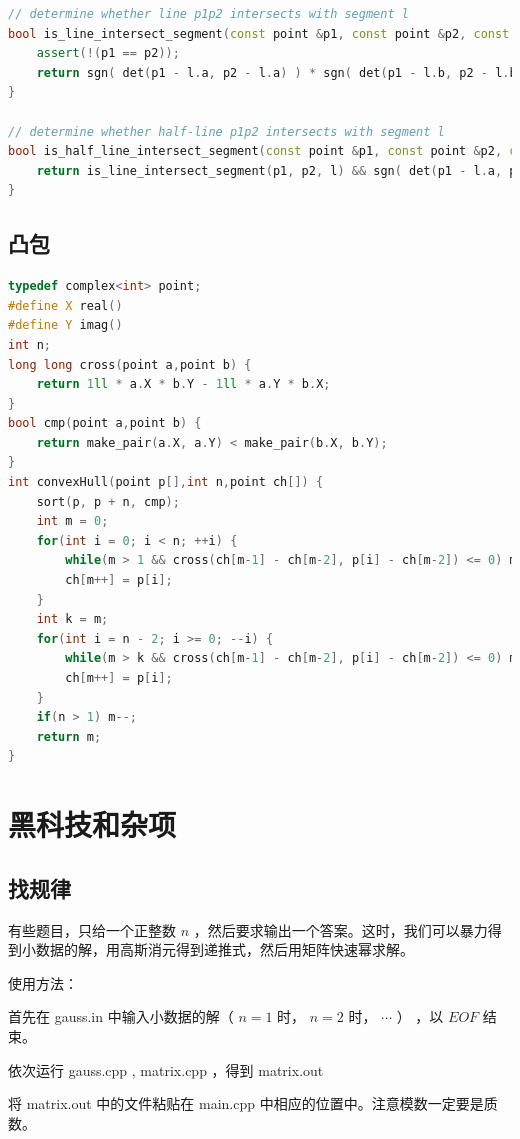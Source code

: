 \documentclass{article}
\begin{document}
\begin{lstlisting}[language=C++]
// determine whether line p1p2 intersects with segment l
bool is_line_intersect_segment(const point &p1, const point &p2, const segment &l) {
	assert(!(p1 == p2));
	return sgn( det(p1 - l.a, p2 - l.a) ) * sgn( det(p1 - l.b, p2 - l.b) ) <= 0;
}

// determine whether half-line p1p2 intersects with segment l
bool is_half_line_intersect_segment(const point &p1, const point &p2, const segment &l) {
	return is_line_intersect_segment(p1, p2, l) && sgn( det(p1 - l.a, p2 - l.a) ) * sgn( det(p1 - l.a, l.b - l.a) ) >= 0;
}

\end{lstlisting}

\subsection{凸包}
\begin{lstlisting}[language=C++]
typedef complex<int> point;
#define X real()
#define Y imag()
int n;
long long cross(point a,point b) {
	return 1ll * a.X * b.Y - 1ll * a.Y * b.X;
}
bool cmp(point a,point b) {
	return make_pair(a.X, a.Y) < make_pair(b.X, b.Y);
}
int convexHull(point p[],int n,point ch[]) {
	sort(p, p + n, cmp);
	int m = 0;
	for(int i = 0; i < n; ++i) {
		while(m > 1 && cross(ch[m-1] - ch[m-2], p[i] - ch[m-2]) <= 0) m--;
		ch[m++] = p[i];
	}
	int k = m;
	for(int i = n - 2; i >= 0; --i) {
		while(m > k && cross(ch[m-1] - ch[m-2], p[i] - ch[m-2]) <= 0) m--;
		ch[m++] = p[i];
	}
	if(n > 1) m--;
	return m;
}
\end{lstlisting}
\section{黑科技和杂项}
\subsection{找规律}
有些题目，只给一个正整数 $n$ ，然后要求输出一个答案。这时，我们可以暴力得到小数据的解，用高斯消元得到递推式，然后用矩阵快速幂求解。

使用方法： 

首先在 gauss.in 中输入小数据的解（ $n = 1$ 时， $n = 2$ 时， $\cdots$ ） ，以 $EOF$ 结束。 

依次运行 gauss.cpp , matrix.cpp ，得到 matrix.out 

将 matrix.out 中的文件粘贴在 main.cpp 中相应的位置中。注意模数一定要是质数。
\end{document}
